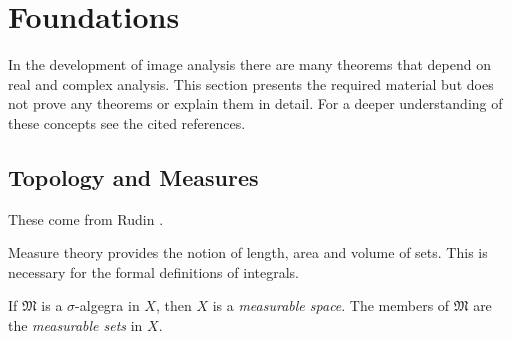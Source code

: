 \chapter{Foundations}
	In the development of image analysis there are many theorems that depend on real and complex analysis. This section presents the required material but does not prove any theorems or explain them in detail. For a deeper understanding of these concepts see the cited references.
	
\section{Topology and Measures}\label{measures}
	These come from Rudin \cite{rudin_1}.
\begin{comment}
Introduce topology.
\begin{dfn}\index{topology}
	A collection $\tau$ of subsets of a set $X$ is a \emph{topology} in $X$ if $\tau$ has the following properties:
	\begin{enumerate}
	\item $\emptyset\in\tau$ and $X\in\tau$.
	\item if $V_i\in\tau$ for $i=1,\ldots,n$, then $V_1\cap\cdots\cap V_n\in\tau$.
	\item If $\{V_\alpha\}$ is an arbitrary collection of members of $\tau$, then $\bigcup_\alpha V_\alpha\in\tau$.
	\end{enumerate}
\end{dfn}
\begin{dfn}\index{$\sigma$-algegra}
	A collection $\mathfrak{M}$ of subsets of $X$ is a \emph{$\sigma$-algegra} if $\mathfrak{M}$ has the following properties in $X$:
	\begin{enumerate}
	\item $X\in\mathfrak{M}$.
	\item If $A\in\mathfrak{M}$ then $A^C\in\mathfrak{M}$ where $A^C$ is the complement of $A$ in $X$.
	\item If $A=\cup_{n=1}^\infty A_n$ for $n=1,2,\ldots$ and $A\in\mathfrak{M}$ then $A\in\mathfrak{M}$
	\end{enumerate}
\end{dfn}
\end{comment}
	Measure theory provides the notion of length, area and volume of sets. This is necessary for the formal definitions of integrals.
\begin{dfn}
	If $\mathfrak{M}$ is a $\sigma$-algegra in $X$, then $X$ is a \emph{measurable space}. The members of $\mathfrak{M}$ are the \emph{measurable sets} in $X$.
\end{dfn}
